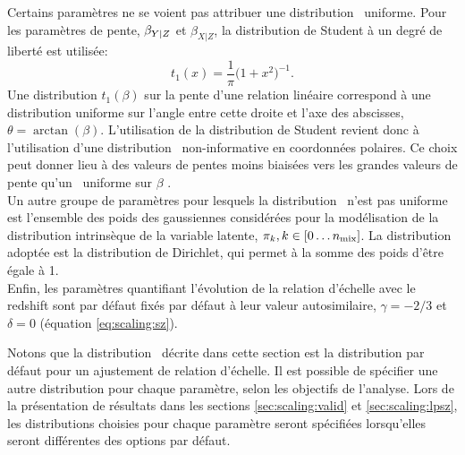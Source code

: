 Certains paramètres ne se voient pas attribuer une distribution \prior\ uniforme.
Pour les paramètres de pente, $\beta_{Y|Z}$ et $\beta_{X|Z}$, la distribution de Student à un degré de liberté est utilisée:
\begin{equation}
    t_1(x) = \frac{1}{\pi} \big(1 + x^2\big)^{-1}.
\end{equation}
Une distribution $t_1(\beta)$ sur la pente d'une relation linéaire correspond à une distribution uniforme sur l'angle entre cette droite et l'axe des abscisses, $\theta = \arctan(\beta)$.
L'utilisation de la distribution de Student revient donc à l'utilisation d'une distribution \prior\ non-informative en coordonnées polaires.
Ce choix peut donner lieu à des valeurs de pentes moins biaisées vers les grandes valeurs de pente qu'un \prior\ uniforme sur $\beta$ \cite{andreon_measurement_2013,sereno_bayesian_2016}. \\
Un autre groupe de paramètres pour lesquels la distribution \prior\ n'est pas uniforme est l'ensemble des poids des gaussiennes considérées pour la modélisation de la distribution intrinsèque de la variable latente, $\pi_k, k \in [0\dots n_{\rm mix}]$.
La distribution adoptée est la distribution de Dirichlet, qui permet à la somme des poids d'être égale à 1. \\
Enfin, les paramètres quantifiant l'évolution de la relation d'échelle avec le redshift sont par défaut fixés par défaut à leur valeur autosimilaire, $\gamma=-2/3$ et $\delta=0$ (équation \ref{eq:scaling:sz}).

Notons que la distribution \prior\ décrite dans cette section est la distribution par défaut pour un ajustement de relation d'échelle.
Il est possible de spécifier une autre distribution pour chaque paramètre, selon les objectifs de l'analyse.
Lors de la présentation de résultats dans les sections \ref{sec:scaling:valid} et \ref{sec:scaling:lpsz}, les distributions choisies pour chaque paramètre seront spécifiées lorsqu'elles seront différentes des options par défaut.

